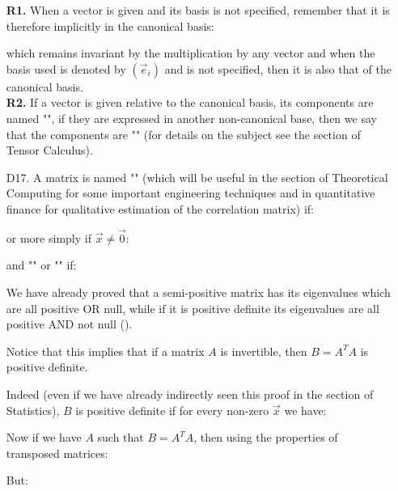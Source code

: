 \begin{enumerate}
		\begin{tcolorbox}[title=Remarks,colframe=black,arc=10pt]
		\textbf{R1.} When a vector is given and its basis is not specified, remember that it is therefore implicitly in the canonical basis:
		
		which remains invariant by the multiplication by any vector and when the basis used is denoted by $(\vec{e}_i)$ and is not specified, then it is also that of the canonical basis.\\
		
		\textbf{R2.} If a vector is given relative to the canonical basis, its components are named "\label{covariant components}",  if they are expressed in another non-canonical base, then we say that the components are "" (for details on the subject see the section of Tensor Calculus).
		\end{tcolorbox}
		
		\item[D17.] A matrix is named "\label{positive definite matrix}" (which will be useful in the section of Theoretical Computing for some important engineering techniques and in quantitative finance for qualitative estimation of the correlation matrix) if:
		
		or more simply if $\vec{x}\neq \vec{0}$:
		
		and "" or "\label{positive semidefinite matrix}" if:
		
		We have already proved that a semi-positive matrix has its eigenvalues which are all positive OR null, while if it is positive definite its eigenvalues are all positive AND not null ().
		
		Notice that this implies that if a matrix $A$ is invertible, then $B=A^TA$ is positive definite.

		Indeed (even if we have already indirectly seen this proof in the section of Statistics), $B$ is positive definite if for every non-zero $\vec{x}$ we have:
		
		Now if we have $A$ such that $B=A^TA$, then using the properties of transposed matrices:
		
		But:
		

\end{enumerate}
